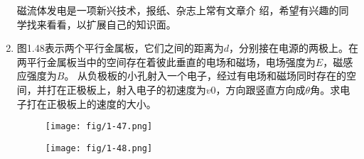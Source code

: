 \begin{enumerate}
磁流体发电是一项新兴技术，报纸、杂志上常有文章介
绍，希望有兴趣的同学找来看看，以扩展自己的知识面。
\item  图1.48表示两个平行金属板，它们之间的距离为$d$，分别接在电源的两极上。在两平行金属板当中的空间存在着彼此垂直的电场和磁场，电场强度为$E$，磁感应强度为$B$。 从负极板的小孔射入一个电子，经过有电场和磁场同时存在的空间，并打在正极板上，射入电子的初速度为$v0$，方向跟竖直方向成$\theta$角。求电子打在正极板上的速度的大小。

\begin{figure}[htp]\centering
	\texttt{[image: fig/1-47.png]}
	\caption{ }
\end{figure}\begin{figure}[htp]\centering
\texttt{[image: fig/1-48.png]}
\caption{ }
\end{figure}
\end{enumerate}




